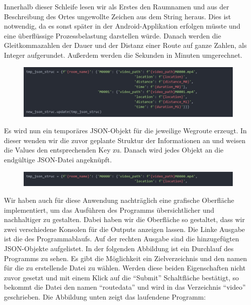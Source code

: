 Innerhalb dieser Schleife lesen wir als Erstes den Raumnamen und aus der Beschreibung des Ortes ungewollte Zeichen aus dem String heraus. Dies ist notwendig, da es sonst später in der Android-Applikation erfolgen müsste und eine überflüssige Prozessbelastung darstellen würde. Danach werden die Gleitkommazahlen der Dauer und der Distanz einer Route auf ganze Zahlen, als Integer aufgerundet. Außerdem werden die Sekunden in Minuten umgerechnet.

\begin{figure}[H]
    \includegraphics[width=\textwidth]{Figures/3DNavigator/code08.jpg}
    \centering
\end{figure} \vspace{-3.5mm}

Es wird nun ein temporäres JSON-Objekt für die jeweilige Wegroute erzeugt. In dieser wenden wir die zuvor geplante Struktur der Informationen an und weisen die Values den entsprechenden Key zu. Danach wird jedes Objekt an die endgültige JSON-Datei angeknüpft.

\begin{figure}[H]
    \includegraphics[width=\textwidth]{Figures/3DNavigator/code09.jpg}
    \centering
\end{figure} \vspace{-3.5mm}

Wir haben auch für diese Anwendung nachträglich eine grafische Oberfläche implementiert, um das Ausführen des Programms übersichtlicher und nachhaltiger zu gestalten. Dabei haben wir die Oberfläche so gestaltet, dass wir zwei verschiedene Konsolen für die Outputs anzeigen lassen. Die Linke Ausgabe ist die des Programmablaufs. Auf der rechten Ausgabe sind die hinzugefügten JSON-Objekte aufgelistet. In der folgenden Abbildung ist ein Durchlauf des Programms zu sehen. Es gibt die Möglichkeit ein Zielverzeichnis und den namen für die zu erstellende Datei zu wählen. Werden diese beiden Eigenschaften nicht zuvor gesetzt und mit einem Klick auf die “Submit” Schaltfläche bestätigt, so bekommt die Datei den namen “routedata” und wird in das Verzeichnis “video” geschrieben. Die Abbildung unten zeigt das laufendene Programm:\vspace{-1.5mm}


